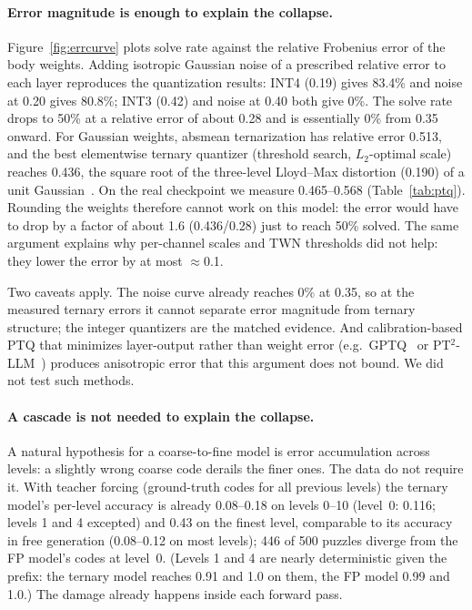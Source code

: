 \documentclass[11pt]{article}
\begin{document}
\paragraph{Error magnitude is enough to explain the collapse.}
Figure~\ref{fig:errcurve} plots solve rate against the relative Frobenius error of the body weights. Adding
isotropic Gaussian noise of a prescribed relative error to each layer reproduces the quantization results:
INT4 (0.19) gives 83.4\% and noise at 0.20 gives 80.8\%; INT3 (0.42) and noise at 0.40 both give 0\%. The solve
rate drops to 50\% at a relative error of about 0.28 and is essentially 0\% from 0.35 onward. For Gaussian
weights, absmean ternarization has relative error 0.513, and the best elementwise ternary quantizer (threshold
search, $L_2$-optimal scale) reaches 0.436, the square root of the three-level Lloyd--Max distortion (0.190) of a unit
Gaussian~\citep{max1960quantizing}. On the real checkpoint we measure 0.465--0.568 (Table~\ref{tab:ptq}). Rounding
the weights therefore cannot work on this model: the error would have to drop by a factor of about 1.6
(0.436/0.28) just to reach 50\% solved. The same argument explains why per-channel scales and TWN thresholds did
not help: they lower the error by at most $\approx$0.1.

Two caveats apply. The noise curve already reaches 0\% at 0.35, so at the measured ternary errors it cannot
separate error magnitude from ternary structure; the integer quantizers are the matched evidence. And
calibration-based PTQ that minimizes layer-output rather than weight error (e.g.\ GPTQ~\citep{frantar2023gptq} or
PT$^2$-LLM~\citep{pt2llm}) produces anisotropic error that this argument does not bound. We did not test such
methods.

\paragraph{A cascade is not needed to explain the collapse.}
A natural hypothesis for a coarse-to-fine model is error accumulation across levels: a slightly wrong coarse
code derails the finer ones. The data do not require it. With teacher forcing (ground-truth codes for all
previous levels) the ternary model's per-level accuracy is already 0.08--0.18 on levels 0--10 (level~0: 0.116;
levels 1 and 4 excepted) and 0.43 on the finest level, comparable to its accuracy in free generation (0.08--0.12 on most levels); 446 of 500
puzzles diverge from the FP model's codes at level~0. (Levels 1 and 4 are nearly deterministic given the prefix:
the ternary model reaches 0.91 and 1.0 on them, the FP model 0.99 and 1.0.) The damage already happens inside
each forward pass.
\end{document}
